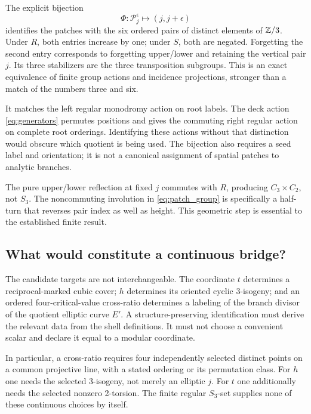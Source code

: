 The explicit bijection
\begin{equation}\label{eq:finite_bridge}
 \boxed{\Phi:\mathcal P_j^\epsilon\longmapsto(j,j+\epsilon)}
\end{equation}
identifies the patches with the six ordered pairs of distinct elements of \(\mathbb Z/3\). Under \(R\), both entries increase by one; under \(S\), both are negated. Forgetting the second entry corresponds to forgetting upper/lower and retaining the vertical pair \(j\). Its three stabilizers are the three transposition subgroups. This is an exact equivalence of finite group actions and incidence projections, stronger than a match of the numbers three and six.

It matches the left regular monodromy action on root labels. The deck action \eqref{eq:generators} permutes positions and gives the commuting right regular action on complete root orderings. Identifying these actions without that distinction would obscure which quotient is being used. The bijection also requires a seed label and orientation; it is not a canonical assignment of spatial patches to analytic branches.

The pure upper/lower reflection at fixed \(j\) commutes with \(R\), producing \(C_3\times C_2\), not \(S_3\). The noncommuting involution in \eqref{eq:patch_group} is specifically a half-turn that reverses pair index as well as height. This geometric step is essential to the established finite result.

\subsection{What would constitute a continuous bridge?}
The candidate targets are not interchangeable. The coordinate \(t\) determines a reciprocal-marked cubic cover; \(h\) determines its oriented cyclic 3-isogeny; and an ordered four-critical-value cross-ratio determines a labeling of the branch divisor of the quotient elliptic curve \(E'\). A structure-preserving identification must derive the relevant data from the shell definitions. It must not choose a convenient scalar and declare it equal to a modular coordinate.

In particular, a cross-ratio requires four independently selected distinct points on a common projective line, with a stated ordering or its permutation class. For \(h\) one needs the selected 3-isogeny, not merely an elliptic \(j\). For \(t\) one additionally needs the selected nonzero 2-torsion. The finite regular \(S_3\)-set supplies none of these continuous choices by itself.

